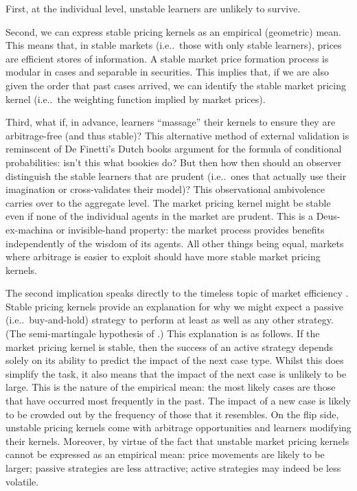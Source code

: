\documentclass[ecta,nameyear,draft]{econsocart}
\makeatletter
\newcommand\ie{i\@.e\@ifnextchar.{}{.\@}}
\theoremstyle{plain}
\theoremstyle{remark}
\makeatother
\begin{document}
First, at the individual level, unstable learners are unlikely to survive.

Second, we can express stable pricing kernels as an empirical (geometric) mean.
This means that, in stable markets (\ie\ those with only stable learners),
prices are efficient stores of information. A stable market price formation
process is modular in cases and separable in securities. This implies that, if
we are also given the order that past cases arrived, we can identify the stable
market pricing kernel (\ie\ the weighting function implied by market prices).
 
Third, what if, in advance, learners ``massage'' their kernels to ensure they
are arbitrage-free (and thus stable)? This alternative method of external
validation is reminscent of De Finetti's Dutch books argument for the formula
of conditional probabilities: isn't this what bookies do?  But then how then
should an observer distinguish the stable learners that are prudent (\ie\ ones
that actually use their imagination or cross-validates their model)?  This
observational ambivolence carries over to the aggregate level.  The market
pricing kernel might be stable even if none of the individual agents in the
market are prudent.  This is a Deus-ex-machina or invisible-hand property: the
market process provides benefits independently of the wisdom of its agents. 
All other things being equal, markets where arbitrage is easier to exploit
should have more stable market pricing kernels.
 
 
The second implication speaks directly to the timeless topic of market
efficiency \citet{fama1970efficient,malkiel2003efficient}.  Stable pricing
kernels provide an explanation for why we might expect a passive (\ie\
buy-and-hold) strategy to perform at least as well as any other strategy.  (The
semi-martingale hypothesis of \citet{fama1970efficient}.) This explanation is
as follows. If the market pricing kernel is stable, then the success of an
active strategy depends solely on its ability to predict the impact of the next
case type.  Whilst this does simplify the task, it also means that the impact
of the next case is unlikely to be large. This is the nature of the empirical
mean: the most likely cases are those that have occurred most frequently in the
past. The impact of a new case is likely to be crowded out by the frequency of
those that it resembles.  On the flip side, unstable pricing kernels come with
arbitrage opportunities and learners modifying their kernels.  Moreover, by
virtue of the fact that unstable market pricing kernels cannot be expressed as
an empirical mean: price movements are likely to be larger; passive strategies
are less attractive; active strategies may indeed be less volatile.
\end{document}
